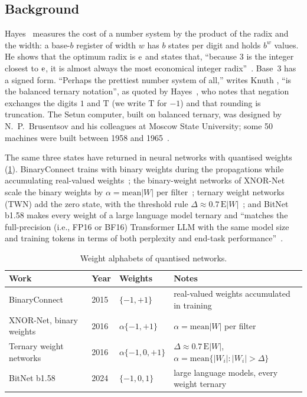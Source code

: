 \documentclass[11pt]{article}
\theoremstyle{definition}\newtheorem{definition}[theorem]{Definition}
\theoremstyle{remark}\newtheorem{remark}[theorem]{Remark}
\newcommand{\T}{\mathrm{T}}
\begin{document}
\subsection{Background}
Hayes~\cite{hayes2001} measures the cost of a number system by the product of the radix and the width: a base-$b$ register of width $w$ has $b$ states per digit and holds $b^w$ values. He shows that the optimum radix is $\mathrm e$ and states that, ``because 3 is the integer closest to $\mathrm e$, it is almost always the most economical integer radix''~\cite{hayes2001}. Base~3 has a signed form. ``Perhaps the prettiest number system of all,'' writes Knuth \cite[Section~4.1]{knuth1997}, ``is the balanced ternary notation'', as quoted by Hayes~\cite{hayes2001}, who notes that negation exchanges the digits $1$ and $\T$ (we write $\T$ for $-1$) and that rounding is truncation. The Setun computer, built on balanced ternary, was designed by N.~P.~Brusentsov and his colleagues at Moscow State University; some 50 machines were built between 1958 and 1965~\cite{hayes2001}.

The same three states have returned in neural networks with quantised weights (\cref{tab:prior}). BinaryConnect trains with binary weights during the propagations while accumulating real-valued weights~\cite{binaryconnect2015}; the binary-weight networks of XNOR-Net scale the binary weights by $\alpha=\mathrm{mean}|W|$ per filter~\cite{xnor2016}; ternary weight networks (TWN) add the zero state, with the threshold rule $\Delta\approx0.7\,\mathrm E|W|$~\cite{twn2016}; and BitNet b1.58 makes every weight of a large language model ternary and ``matches the full-precision (i.e., FP16 or BF16) Transformer LLM with the same model size and training tokens in terms of both perplexity and end-task performance''~\cite{bitnet158}.

\begin{table}[ht]
\centering\small
\caption{Weight alphabets of quantised networks.}\label{tab:prior}
\begin{tabular}{@{}llll@{}}
\toprule
Work & Year & Weights & Notes\\
\midrule
BinaryConnect \cite{binaryconnect2015} & 2015 & $\{-1,+1\}$ & real-valued weights accumulated in training\\
XNOR-Net, binary weights \cite{xnor2016} & 2016 & $\alpha\{-1,+1\}$ & $\alpha=\mathrm{mean}|W|$ per filter\\
Ternary weight networks \cite{twn2016} & 2016 & $\alpha\{-1,0,+1\}$ & $\Delta\approx0.7\,\mathrm E|W|$, $\alpha=\mathrm{mean}\{|W_i|:|W_i|>\Delta\}$\\
BitNet b1.58 \cite{bitnet158} & 2024 & $\{-1,0,1\}$ & large language models, every weight ternary\\
\bottomrule
\end{tabular}
\end{table}
\end{document}
